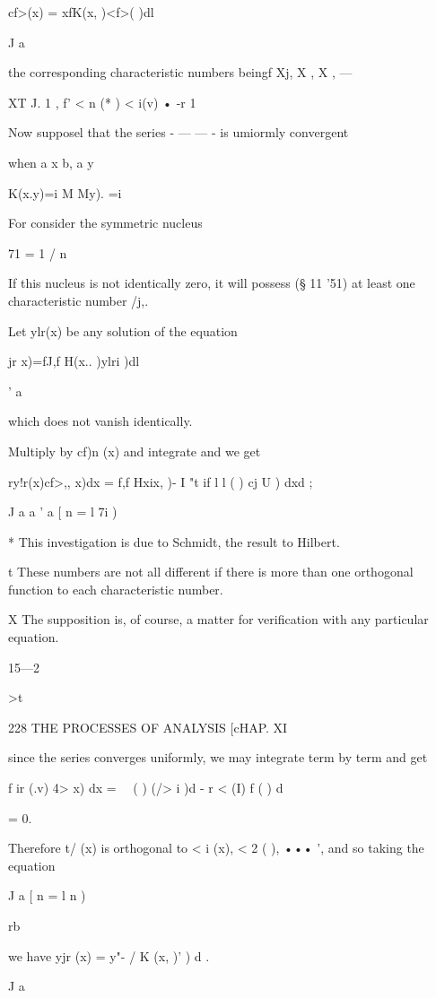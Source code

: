 {cf>(x) = xfK(x, )<f>( )dl

J a

the corresponding characteristic numbers beingf Xj, X , X , —

XT J. 1 , f' < n (* ) < i(v) • -r 1

Now supposel that the series - — — - is umiormly convergent

when a x b, a y %

K(x.y)=i M My). =i

For consider the symmetric nucleus

71 = 1 / n

If this nucleus is not identically zero, it will possess (§ 11 '51) at
least one characteristic number /j,.

Let ylr(x) be any solution of the equation

 jr x)=fJ,f H(x.. )ylri )dl

' a

which does not vanish identically.

Multiply by cf)n (x) and integrate and we get

ry!r(x)cf>,, x)dx = f,f Hxix, )- I "t if l l ( ) cj U ) dxd ;

J a a ' a [ n = l 7i )

* This investigation is due to Schmidt, the result to Hilbert.

t These numbers are not all different if there is more than one
orthogonal function to each characteristic number.

X The supposition is, of course, a matter for verification with any
particular equation.

15—2



>t\



228 THE PROCESSES OF ANALYSIS [cHAP. XI

since the series converges uniformly, we may integrate term by term
and get

f ir (.v) 4> x) dx = \ \ ( ) (/> i )d - r < (I) f ( ) d

= 0.

Therefore t/ (x) is orthogonal to < i (x), < 2 ( ), ••• ', and so
taking the equation

J a [ n = l n )

rb

we have yjr (x) = y"- / K (x, )' ) d .

J a

}
